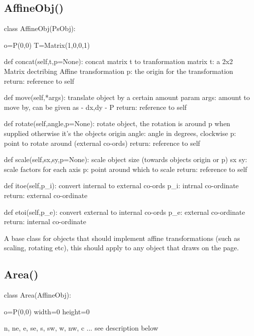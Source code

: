 \documentclass[a4paper]{book}
\begin{document}
\subsection{AffineObj()}
\label{sec:affineobj}
\begin{python}
class AffineObj(PsObj):

    o=P(0,0)
    T=Matrix(1,0,0,1)

    def concat(self,t,p=None):
        concat matrix t to tranformation matrix
          t: a 2x2 Matrix dectribing Affine transformation
          p: the origin for the transformation
          return: reference to self

    def move(self,*args):
        translate object by a certain amount
          param args: amount to move by, can be given as
            - dx,dy
            - P
          return: reference to self

    def rotate(self,angle,p=None):
        rotate object, 
        the rotation is around p when supplied otherwise
        it's the objects origin
          angle: angle in degrees, clockwise
          p: point to rotate around (external co-ords)
          return: reference to self

    def scale(self,sx,sy,p=None):
        scale object size (towards objects origin or p)
          sx sy: scale factors for each axis
          p: point around which to scale
          return: reference to self

    def itoe(self,p_i):
        convert internal to external co-ords
          p_i: intrnal co-ordinate
          return: external co-ordinate
        
    def etoi(self,p_e):
        convert external to internal co-ords
          p_e: external co-ordinate
          return: internal co-ordinate
\end{python}

A base class for objects that should implement affine transformations
(such as scaling, rotating etc), this should apply to any object that
draws on the page.


\subsection{Area()}
\label{sec:area}
\begin{python}
class Area(AffineObj):

    o=P(0,0)
    width=0
    height=0

    n, ne, e, se, s, sw, w, nw, c  ... see description below
\end{python}
\end{document}
